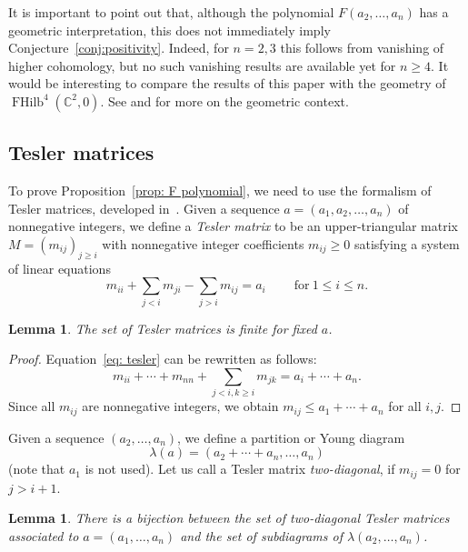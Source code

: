 \documentclass[11pt,reqno]{amsart}
\newcommand{\defn}[1]{{\color{darkred}\emph{#1}}} %
\newtheorem{lemma}[theorem]{Lemma}
\theoremstyle{definition}
\numberwithin{equation}{section}
\DeclareMathOperator{\FHilb}{FHilb}
\newcommand{\CC}{\mathbb{C}}
\begin{document}
It is important to point out that, although the polynomial $F(a_2,\ldots,a_n)$ has a geometric interpretation, this does 
not immediately imply Conjecture~\ref{conj:positivity}. Indeed, for $n=2,3$ this follows from vanishing of higher cohomology, 
but no such vanishing results are available yet for $n\geqslant 4$. It would be interesting to compare the results of this paper 
with the geometry of $\FHilb^4(\CC^2,0)$.  See \cite[Section 1.4]{GNR.2016} and \cite[Conjecture 6.4.2]{OR.2017} for more
on the geometric context.

\subsection{Tesler matrices}
\label{subsec:Tesler}

To prove Proposition~\ref{prop: F polynomial}, we need to use the formalism of Tesler matrices, developed 
in~\cite{Haglund.2011,AGHRS.2012,GHX.2014}. Given a sequence $a=(a_1,a_2,\ldots,a_n)$ of nonnegative integers, 
we define a \defn{Tesler matrix} to be an upper-triangular matrix $M=(m_{ij})_{j\geqslant i}$ with nonnegative integer 
coefficients $m_{ij}\geqslant 0$ satisfying a system of linear equations
\begin{equation}
\label{eq: tesler}
	m_{ii}+\sum_{j<i}m_{ji}-\sum_{j>i}m_{ij}=a_i\  \qquad \text{for}\ 1\leqslant i \leqslant n.
\end{equation}

\begin{lemma}
\label{lem:tesler finite}
The set of Tesler matrices is finite for fixed $a$.
\end{lemma}

\begin{proof}
Equation~\eqref{eq: tesler} can be rewritten as follows:
\begin{equation}
\label{eq: tesler 2}
	m_{ii}+\cdots+m_{nn}+\sum_{j<i,k\geqslant i}m_{jk}=a_i+\cdots+a_n.
\end{equation} 
Since all $m_{ij}$ are nonnegative integers, we obtain $m_{ij}\leqslant a_1+\cdots+a_n$ for all $i,j$.
\end{proof}

Given a sequence $(a_2,\ldots,a_n)$, we define a partition or Young diagram
$$\lambda(a)=(a_2+\cdots+a_n,\ldots,a_n)$$ (note that $a_1$ is not used). Let us call a Tesler matrix \defn{two-diagonal},
if $m_{ij}=0$ for $j>i+1$.

\begin{lemma}
\label{lem:subdiagrams}
There is a bijection between the set of two-diagonal Tesler matrices associated to $a=(a_1,\ldots,a_n)$ and the set 
of subdiagrams of $\lambda(a_2,\ldots,a_n)$.
\end{lemma}
\end{document}
